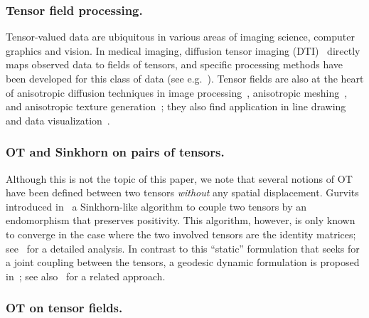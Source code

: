 \subsubsection{Tensor field processing.}

Tensor-valued data are ubiquitous in various areas of imaging science, computer graphics and vision. In medical imaging, diffusion tensor imaging (DTI)~\cite{wandell2016clarifying} directly maps observed data to fields of tensors, and specific processing methods have been developed for this class of data (see e.g.~\cite{Dryden2009,Deriche2006}). Tensor fields are also at the heart of anisotropic diffusion techniques in image processing~\cite{weickert1998anisotropic}, anisotropic meshing~\cite{alliez2003anisotropic,demaret2006image,peyre-iccv-09}, and anisotropic texture generation~\cite{LagaImproving}; they also find application in line drawing~\cite{VaxmanCDPBHB16} and data visualization~\cite{HotzFHHJJ04}. 

\subsubsection{OT and Sinkhorn on pairs of tensors.}

Although this is not the topic of this paper, we note that several %
notions of OT have been defined between two tensors \emph{without} any spatial displacement. Gurvits introduced in~\cite{gurvits2004classical} a Sinkhorn-like algorithm to couple two tensors by an endomorphism that preserves positivity. This algorithm, however, is only known to converge in the case where the two involved tensors are the identity matrices;  see~\cite{georgiou2015positive} for a detailed analysis. 
%
In contrast to this ``static'' formulation that seeks for a joint coupling between the tensors, a geodesic dynamic formulation is proposed in~\cite{Carlen2014}; see also~\cite{Chen2016,ChenGangbo17} for a related approach.



\subsubsection{OT on tensor fields.}

